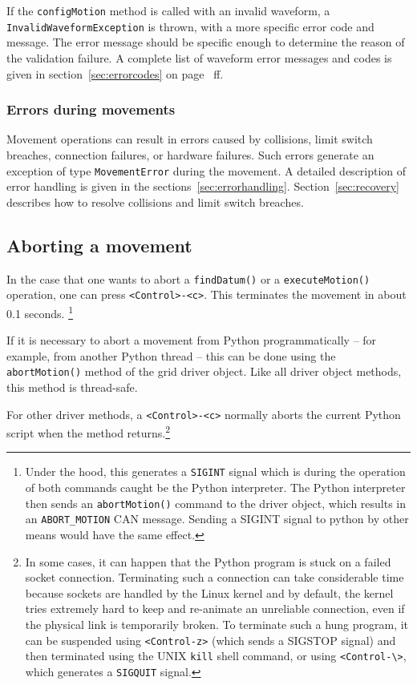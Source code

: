 \documentclass[11pt,a4paper]{report}
\begin{document}
If the \texttt{configMotion} method is called with an invalid
waveform, a \texttt{InvalidWaveformException} is thrown, with a more
specific error code and message. The error message should be specific
enough to determine the reason of the validation failure.  A complete
list of waveform error messages and codes is given in
section~\ref{sec:errorcodes} on page~\pageref{sec:errorcodes} ff.


\subsubsection{Errors during movements}
Movement operations can result in errors caused by collisions, limit
switch breaches, connection failures, or hardware failures. Such
errors generate an exception of type \texttt{MovementError} during the
movement. A detailed description of error handling is given in the
sections~\ref{sec:errorhandling}. Section~\ref{sec:recovery} describes
how to resolve collisions and limit switch breaches.



\subsection{Aborting a movement}
  In the case
that one wants to abort a \texttt{findDatum()} or a
\texttt{executeMotion()} operation, one can press
\verb+<Control>-<c>+. This terminates the movement in about 0.1
seconds. \footnote{Under the hood, this generates a \texttt{SIGINT}
  signal which is during the operation of both commands caught be the
  Python interpreter. The Python interpreter then sends an
  \texttt{abortMotion()} command to the driver object, which results
  in an \texttt{ABORT\_MOTION} CAN message. Sending a SIGINT signal to
  python by other means would have the same effect.}

If it is necessary to abort a movement from Python programmatically --
for example, from another Python thread -- this can be done using the
\texttt{abortMotion()} method of the grid driver object.  Like all
driver object methods, this method is thread-safe.

For other driver methods, a \verb+<Control>-<c>+ normally aborts the
current Python script when the method returns.\footnote{
  In some cases, it
  can happen that the Python program is stuck on a failed socket
  connection. Terminating such a connection can take considerable time
  because sockets are handled by the Linux kernel and by default, the
  kernel tries extremely hard to keep and re-animate an unreliable
  connection, even if the physical link is temporarily broken. To
  terminate such a hung program, it can be suspended using
  \texttt{<Control-z>} (which sends a SIGSTOP signal) and then
  terminated using the UNIX \texttt{kill} shell command, or using
  \texttt{<Control-\textbackslash>}, which generates a
  \texttt{SIGQUIT} signal.}
\end{document}
